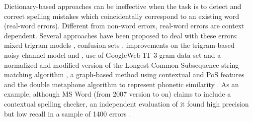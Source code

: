 Dictionary-based approaches can be ineffective when the task is to detect and correct spelling mistakes which coincidentally correspond to an existing word (real-word errors). Different from non-word errors, real-word errors are context dependent. Several approaches have been proposed to deal with these errors: mixed trigram models \cite{Fossati2007}, confusion sets \cite{Fossati2008}, improvements on the trigram-based noisy-channel model \cite{Mays1991} and \cite{WilcoxOHearn2008}, use of GoogleWeb 1T 3-gram data set and a normalized and modified version of the Longest Common Subsequence string matching algorithm \cite{Islam2009}, a graph-based method using contextual and PoS features and the double metaphone algorithm to represent phonetic similarity \cite{Sonmez2014}. As an example, although MS Word (from 2007 version to on) claims to include a contextual spelling checker, an independent evaluation of it found high precision but low recall in a sample of 1400 errors \cite{Hirst2008}.

